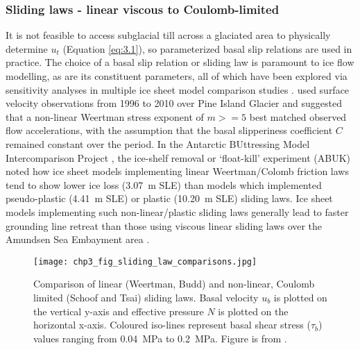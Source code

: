 \subsubsection{Sliding laws - linear viscous to Coulomb-limited}


It is not feasible to access subglacial till across a glaciated area to physically determine $u_t$ (Equation \eqref{eq:3.1}), so parameterized basal slip relations are used in practice.
The choice of a basal slip relation or sliding law is paramount to ice flow modelling, as are its constituent parameters, all of which have been explored via sensitivity analyses in multiple ice sheet model comparison studies \citep[e.g.][]{SeroussiinitMIPAntarcticaicesheet2019,SunAntarcticicesheet2020,ZhangcomparisontwoStokes2017}.
\citet{Gillet-ChauletAssimilationsurfacevelocities2016} used surface velocity observations from 1996 to 2010 over Pine Island Glacier and suggested that a non-linear Weertman stress exponent of $m >= 5$ best matched observed flow accelerations, with the assumption that the basal slipperiness coefficient $C$ remained constant over the period.
In the Antarctic BUttressing Model Intercomparison Project \citep[ABUMIP;][]{SunAntarcticicesheet2020}, the ice-shelf removal or `float-kill' experiment (ABUK) noted how ice sheet models implementing linear Weertman/Colomb friction laws tend to show lower ice loss (\SI{3.07}{\metre} SLE) than models which implemented pseudo-plastic (\SI{4.41}{\metre} SLE) or plastic (\SI{10.20}{\metre} SLE) sliding laws.
Ice sheet models implementing such non-linear/plastic sliding laws generally lead to faster grounding line retreat than those using viscous linear sliding laws over the Amundsen Sea Embayment area \citep[e.g.][]{JoughinBasalconditionsPine2009,RitzPotentialsealevelrise2015,BrondexSensitivitygroundingline2017,BulthuisUncertaintyquantificationmulticentennial2019}.

\begin{figure}[htbp]
  \texttt{[image: chp3\_fig\_sliding\_law\_comparisons.jpg]}
  \caption[Comparison of Weertman, Budd, Schoof and Tsai sliding laws]{
    Comparison of linear (Weertman, Budd) and non-linear, Coulomb limited (Schoof and Tsai) sliding laws.
    Basal velocity $u_b$ is plotted on the vertical y-axis and effective pressure $N$ is plotted on the horizontal x-axis.
    Coloured iso-lines represent basal shear stress ($\tau_b$) values ranging from \SI{0.04}{\mega\pascal} to \SI{0.2}{\mega\pascal}.
    Figure is from \citet{BrondexSensitivitygroundingline2017}.
  }
  \label{fig:sliding_laws}
\end{figure}

